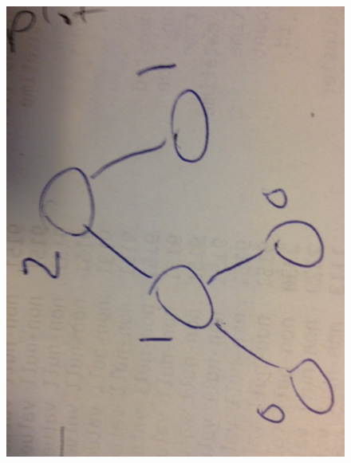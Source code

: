 \begin{figure}[!h]
    \centering
    \includegraphics[width=0.9\columnwidth]{idea_height}
\end{figure}

